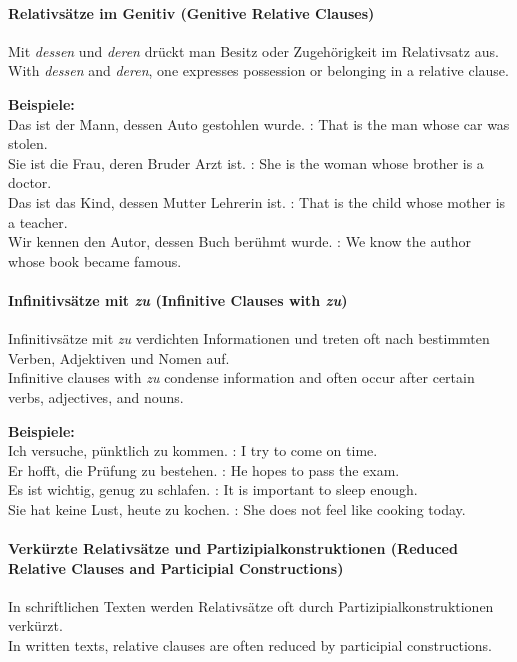 \documentclass[a4paper]{article}
\begin{document}
        \paragraph{Relativsätze im Genitiv {\small (Genitive Relative Clauses)}}
            Mit \textit{dessen} und \textit{deren} drückt man Besitz oder Zugehörigkeit im Relativsatz aus.\\
            With \textit{dessen} and \textit{deren}, one expresses possession or belonging in a relative clause.
            
            \textbf{Beispiele:}\\
            Das ist der Mann, dessen Auto gestohlen wurde. : That is the man whose car was stolen.\\
            Sie ist die Frau, deren Bruder Arzt ist. : She is the woman whose brother is a doctor.\\
            Das ist das Kind, dessen Mutter Lehrerin ist. : That is the child whose mother is a teacher.\\
            Wir kennen den Autor, dessen Buch berühmt wurde. : We know the author whose book became famous.
        
        \paragraph{Infinitivsätze mit \textit{zu} {\small (Infinitive Clauses with \textit{zu})}}
            Infinitivsätze mit \textit{zu} verdichten Informationen und treten oft nach bestimmten Verben, Adjektiven und Nomen auf.\\
            Infinitive clauses with \textit{zu} condense information and often occur after certain verbs, adjectives, and nouns.
            
            \textbf{Beispiele:}\\
            Ich versuche, pünktlich zu kommen. : I try to come on time.\\
            Er hofft, die Prüfung zu bestehen. : He hopes to pass the exam.\\
            Es ist wichtig, genug zu schlafen. : It is important to sleep enough.\\
            Sie hat keine Lust, heute zu kochen. : She does not feel like cooking today.
        
        \paragraph{Verkürzte Relativsätze und Partizipialkonstruktionen {\small (Reduced Relative Clauses and Participial Constructions)}}
            In schriftlichen Texten werden Relativsätze oft durch Partizipialkonstruktionen verkürzt.\\
            In written texts, relative clauses are often reduced by participial constructions.
            
\end{document}
